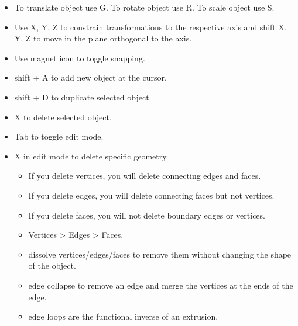 \documentclass[12pt]{article}
\begin{document}
\begin{itemize}
    \item To translate object use G. To rotate object use R. To scale object use S.
    \item Use X, Y, Z to constrain transformations to the respective axis and shift X, Y, Z to move in the plane orthogonal to the axis.
    \item Use magnet icon to toggle snapping.
    \item shift + A to add new object at the cursor.
    \item shift + D to duplicate selected object.
    \item X to delete selected object.
    \item Tab to toggle edit mode.
    \item X in edit mode to delete specific geometry.
        \begin{itemize}
            \item If you delete vertices, you will delete connecting edges and faces.
            \item If you delete edges, you will delete connecting faces but not vertices.
            \item If you delete faces, you will not delete boundary edges or vertices.
            \item Vertices > Edges > Faces.
            \item dissolve vertices/edges/faces to remove them without changing the shape of the object.
            \item edge collapse to remove an edge and merge the vertices at the ends of the edge.
            \item edge loops are the functional inverse of an extrusion.
        \end{itemize}
\end{itemize}
\end{document}
